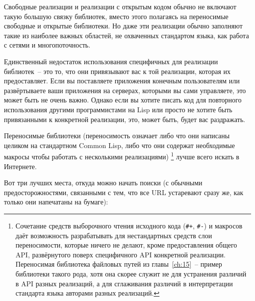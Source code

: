 Свободные реализации и реализации с открытым кодом обычно не включают такую большую связку
библиотек, вместо этого полагаясь на переносимые свободные и открытые библиотеки. Но даже
эти реализации обычно заполняют такие из наиболее важных областей, не охваченных
стандартом языка, как работа с сетями и многопоточность.

Единственный недостаток использования специфичных для реализации библиотек~-- это то, что
они привязывают вас к той реализации, которая их предоставляет. Если вы поставляете
приложения конечным пользователям или развёртываете ваши приложения на серверах, которыми
вы сами управляете, это может быть не очень важно. Однако если вы хотите писать код для
повторного использования другими программистами на Lisp или просто не хотите быть
привязанными к конкретной реализации, это, может быть, будет вас раздражать.

Переносимые библиотеки (переносимость означает либо что они написаны целиком на
стандартном Common Lisp, либо что они содержат необходимые макросы чтобы работать с
несколькими реализациями) \footnote{Сочетание средств выборочного чтения исходного кода
  (\lstinline!#+!, \lstinline!#-!) и макросов даёт возможность разрабатывать для
  нестандартных средств слои переносимости, которые ничего не делают, кроме предоставления
  общего API, развёрнутого поверх специфичного API конкретной реализации. Переносимая
  библиотека файловых путей из главы~\ref{ch:15}~-- пример библиотеки такого рода, хотя
  она скорее служит не для устранения различий в API разных реализаций, а для сглаживания
  различий в интерпретации стандарта языка авторами разных реализаций.} лучше всего искать
в Интернете.

Вот три лучших места, откуда можно начать поиски (с обычными предосторожностями,
связанными с тем, что все URL устаревают сразу же, как только они напечатаны на бумаге):

